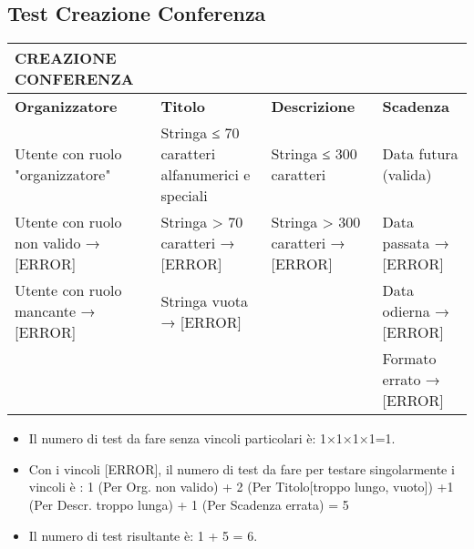 \subsection{Test Creazione Conferenza}
\label{sec:test_creaszione_conferenzza}

\begin{tabular}{|p{3.5cm}|p{2cm}|p{2cm}|p{3cm}|}
\hline
\rowcolor{SkyBlue}
\textbf{CREAZIONE CONFERENZA} & & &\\
\hline
\rowcolor{Red}
\textbf{Organizzatore} & \textbf{Titolo} & \textbf{Descrizione} & \textbf{Scadenza}  \\
\hline
 Utente con ruolo "organizzatore" & Stringa ≤ 70 caratteri alfanumerici e speciali &  Stringa ≤ 300 caratteri & Data futura (valida) \\
Utente con ruolo non valido → [ERROR] &  Stringa > 70 caratteri → [ERROR] & Stringa > 300 caratteri → [ERROR] & Data passata → [ERROR] \\
Utente con ruolo mancante → [ERROR] & Stringa vuota → [ERROR] &  & Data odierna → [ERROR] \\
& & & Formato errato → [ERROR] \\
\hline
\end{tabular}

\begin{itemize}
\item Il numero di test da fare senza vincoli particolari è: 1×1×1×1=1.
\item Con i vincoli [ERROR], il numero di test da fare per testare singolarmente i vincoli è : 1 (Per Org. non valido) + 2 (Per Titolo[troppo lungo, vuoto]) +1 (Per Descr. troppo lunga) + 1 (Per Scadenza errata) = 5
\item Il numero di test risultante è: 1 + 5 = 6.
\end{itemize}

